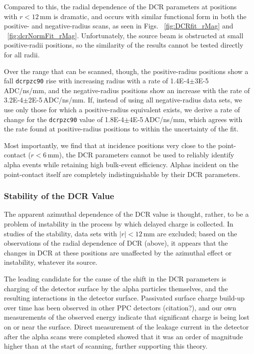 \documentclass[groupedaddress,rmp,amsmath,amssymb,bibnotes,altaffilletter,twocolumn]{revtex4-1}
\begin{document}
Compared to this, the radial dependence of the DCR parameters at positions with $r<12$\,mm is dramatic, and occurs with similar functional form in both the positive- and negative-radius scans, as seen in Figs. ~\ref{fig:DCRfit_rMag} and ~\ref{fig:dcrNormFit_rMag}. Unfortunately, the source beam is obstructed at small positive-radii positions, so the similarity of the results cannot be tested directly for all radii. 

Over the range that can be scanned, though, the positive-radius positions show a fall {\tt dcrpzc90} rise with increasing radius with a rate of 1.4E-4$\pm$3E-5\,ADC/ns/mm, and the negative-radius positions show an increase with the rate of 3.2E-4$\pm$2E-5\,ADC/ns/mm. If, instead of using all negative-radius data sets, we use only those for which a positive-radius equivalent exists, we derive a rate of change for the {\tt dcrpzc90} value of 1.8E-4$\pm$4E-5\,ADC/ns/mm, which agrees with the rate found at positive-radius positions to within the uncertainty of the fit. 

Most importantly, we find that at incidence positions very close to the point-contact ($r<6$\,mm), the DCR parameters cannot be used to reliably identify alpha events while retaining high bulk-event efficiency. Alphas incident on the point-contact itself are completely indistinguishable by their DCR parameters.   

\subsubsection{Stability of the DCR Value}
The apparent azimuthal dependence of the DCR value is thought, rather, to be a problem of instability in the process by which delayed charge is collected. In studies of the stability, data sets with $|r|<12$\,mm are excluded; based on the observations of the radial dependence of DCR (above), it appears that the changes in DCR at these positions are unaffected by the azimuthal effect or instability, whatever its source. 

The leading candidate for the cause of the shift in the DCR parameters is charging of the detector surface by the alpha particles themselves, and the resulting interactions in the detector surface. Passivated surface charge build-up over time has been observed in other PPC detectors (citation?), and our own measurements of the observed energy indicate that significant charge is being lost on or near the surface. Direct measurement of the leakage current in the detector after the alpha scans were completed showed that it was an order of magnitude higher than at the start of scanning, further supporting this theory. 
\end{document}

